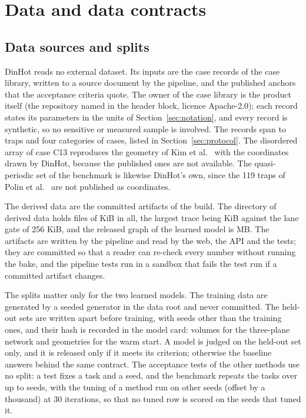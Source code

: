 
\section{Data and data contracts}\label{sec:data}

\subsection{Data sources and splits}\label{sec:data-sources}

DinHot reads no external dataset. Its inputs are the \nCases{} case records of the case library, written to a source document by the pipeline, and the published anchors that the acceptance criteria quote. The owner of the case library is the product itself (the repository named in the header block, licence Apache-2.0); each record states its parameters in the units of Section~\ref{sec:notation}, and every record is synthetic, so no sensitive or measured sample is involved. The records span \minTraps{} to \maxTraps{} traps and four categories of cases, listed in Section~\ref{sec:protocol}. The disordered array of case C13 reproduces the geometry of Kim et al.~\cite{kim2019} with the coordinates drawn by DinHot, because the published ones are not available. The quasi-periodic set of the benchmark is likewise DinHot's own, since the 119 traps of Polin et al.~\cite{polin} are not published as coordinates.

The derived data are the committed artifacts of the build. The directory of derived data holds \derivedFiles{} files of \derivedKiB{} KiB in all, the largest trace being \traceMaxKiB{} KiB against the lane gate of 256 KiB, and the released graph of the learned model is \cghBytes{} MB. The artifacts are written by the pipeline and read by the web, the API and the tests; they are committed so that a reader can re-check every number without running the bake, and the pipeline tests run in a sandbox that fails the test run if a committed artifact changes.

The splits matter only for the two learned models. The training data are generated by a seeded generator in the data root and never committed. The held-out sets are written apart before training, with seeds other than the training ones, and their hash is recorded in the model card: \cghN{} volumes for the three-plane network and \wsN{} geometries for the warm start. A model is judged on the held-out set only, and it is released only if it meets its criterion; otherwise the baseline answers behind the same contract. The acceptance tests of the other methods use no split: a test fixes a task and a seed, and the benchmark repeats the tasks over up to \benchSeeds{} seeds, with the tuning of a method run on other seeds (offset by a thousand) at 30 iterations, so that no tuned row is scored on the seeds that tuned it.

